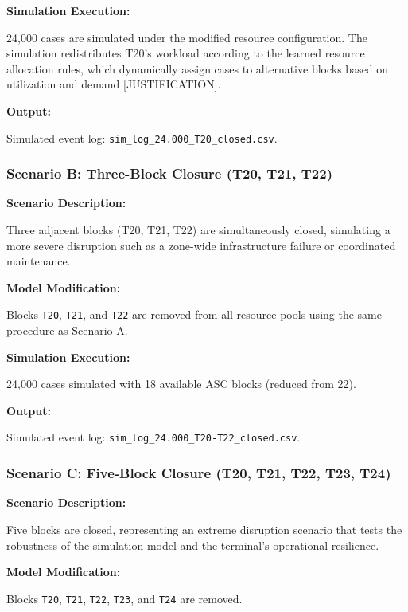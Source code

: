         \textbf{Simulation Execution:}
        
        24,000 cases are simulated under the modified resource configuration. The simulation redistributes T20's workload according to the learned resource allocation rules, which dynamically assign cases to alternative blocks based on utilization and demand [JUSTIFICATION].
        
        \textbf{Output:}
        
        Simulated event log: \texttt{sim\_log\_24.000\_T20\_closed.csv}.

        \subsubsection{Scenario B: Three-Block Closure (T20, T21, T22)}
        
        \textbf{Scenario Description:}
        
        Three adjacent blocks (T20, T21, T22) are simultaneously closed, simulating a more severe disruption such as a zone-wide infrastructure failure or coordinated maintenance.
        
        \textbf{Model Modification:}
        
        Blocks \texttt{T20}, \texttt{T21}, and \texttt{T22} are removed from all resource pools using the same procedure as Scenario A.
        
        \textbf{Simulation Execution:}
        
        24,000 cases simulated with 18 available ASC blocks (reduced from 22).
        
        \textbf{Output:}
        
        Simulated event log: \texttt{sim\_log\_24.000\_T20-T22\_closed.csv}.

        \subsubsection{Scenario C: Five-Block Closure (T20, T21, T22, T23, T24)}
        
        \textbf{Scenario Description:}
        
        Five blocks are closed, representing an extreme disruption scenario that tests the robustness of the simulation model and the terminal's operational resilience.
        
        \textbf{Model Modification:}
        
        Blocks \texttt{T20}, \texttt{T21}, \texttt{T22}, \texttt{T23}, and \texttt{T24} are removed.
        
